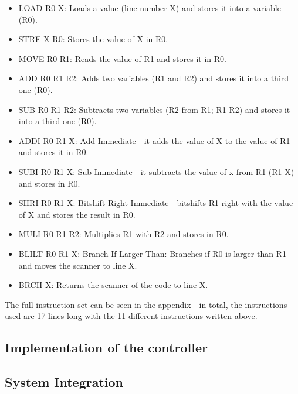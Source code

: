 \documentclass[12pt,a4paper]{article}
\begin{document}
	\begin{itemize}
			
			\item LOAD R0 X: Loads a value (line number X) and stores it into a variable (R0).
			\item STRE X R0: Stores the value of X in R0.
			\item MOVE R0 R1: Reads the value of R1 and stores it in R0.
			\item ADD R0 R1 R2: Adds two variables (R1 and R2) and stores it into a third one (R0).
			\item SUB R0 R1 R2: Subtracts two variables (R2 from R1; R1-R2) and stores it into a third one (R0).
			
			\item ADDI R0 R1 X: Add Immediate - it adds the value of X to the value of R1 and stores it in R0.
			\item SUBI R0 R1 X: Sub Immediate - it subtracts the value of x from R1 (R1-X) and stores in R0.
			\item SHRI R0 R1 X: Bitshift Right Immediate - bitshifts R1 right with the value of X and stores the result in R0.
			\item MULI R0 R1 R2: Multiplies R1 with R2 and stores in R0.
			\item BLILT R0 R1 X: Branch If Larger Than: Branches if R0 is larger than R1 and moves the scanner to line X.
			\item BRCH X: Returns the scanner of the code to line X.
		\end{itemize}
	The full instruction set can be seen in the appendix - in total, the instructions used are 17 lines long with the 11 different instructions written above.
\subsection{Implementation of the controller}
	
\subsection{System Integration}
	
\end{document}
